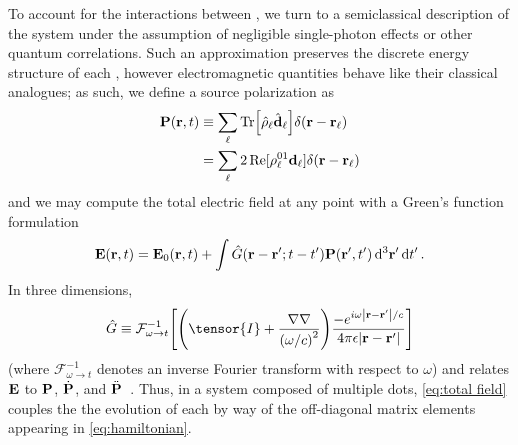 To account for the interactions between \qds{}, we turn to a semiclassical description of the system under the assumption of negligible single-photon effects or other quantum correlations.
Such an approximation preserves the discrete energy structure of each \qd{}, however electromagnetic quantities behave like their classical analogues;
as such, we define a source polarization as
\begin{equation}
  \begin{aligned}
    \vb{P}(\vb{r}, t) &\equiv \sum_\ell \Tr[\hat{\rho}_\ell \hat{\vb{d}}_\ell] \delta(\vb{r} - \vb{r}_\ell) \\
                      &= \sum_\ell 2 \Re[\rho_\ell^{01}\vb{d}_\ell]\delta(\vb{r} - \vb{r}_\ell)
  \end{aligned}
\end{equation}
and we may compute the total electric field at any point with a Green's function formulation
\begin{equation}
  \vb{E}(\vb{r}, t) = \vb{E}_0(\vb{r}, t) + \int \hat{G}(\vb{r} - \vb{r}'; t - t')\vb{P}(\vb{r}', t') \dd[3]{\vb{r}'} \dd{t'}.
  \label{eq:total field}
\end{equation}
In three dimensions,
\begin{equation}
  \hat{G} \equiv \mathcal{F}_{\omega \to t}^{-1}\qty[ \qty(\tensor{I} + \frac{\nabla \nabla}{\qty(\omega/c)^2})\frac{-e^{i \omega \abs{\vb{r} - \vb{r}'}/c}}{4\pi \epsilon \abs{\vb{r} - \vb{r}'}} ]
  \label{eq:dyadic}
\end{equation}
(where $\mathcal{F}_{\omega \to t}^{-1}$ denotes an inverse Fourier transform with respect to $\omega$) and relates $\vb{E}$ to $\vb{P}$, $\dot{\vb{P}}$, and $\ddot{\vb{P}}$~\cite{Rothwell2009}.
Thus, in a system composed of multiple dots, \cref{eq:total field} couples the the evolution of each \qd{} by way of the off-diagonal matrix elements appearing in \cref{eq:hamiltonian}.
